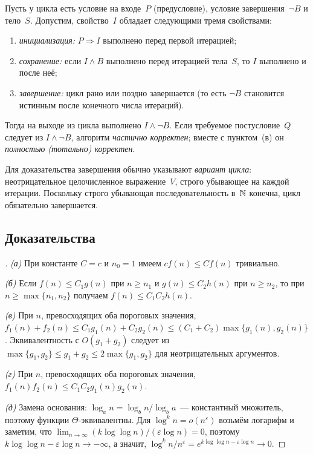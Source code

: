 \begin{theorem}
\label{thm:loop-invariant}
Пусть у цикла есть условие на входе~$P$ (предусловие), условие
завершения~$\neg B$ и тело~$S$. Допустим, свойство~$I$ обладает
следующими тремя свойствами:
\begin{enumerate}[label=(\alph*)]
  \item \emph{инициализация:} $P \Rightarrow I$ выполнено перед первой
        итерацией;
  \item \emph{сохранение:} если $I \wedge B$ выполнено перед итерацией
        тела~$S$, то $I$ выполнено и после неё;
  \item \emph{завершение:} цикл рано или поздно завершается (то есть
        $\neg B$ становится истинным после конечного числа итераций).
\end{enumerate}
Тогда на выходе из цикла выполнено $I \wedge \neg B$. Если требуемое
постусловие~$Q$ следует из $I \wedge \neg B$, алгоритм
\emph{частично корректен}; вместе с пунктом~(в) он
\emph{полностью (тотально) корректен}.
\end{theorem}

Для доказательства завершения обычно указывают \emph{вариант цикла}:
неотрицательное целочисленное выражение~$V$, строго убывающее на
каждой итерации. Поскольку строго убывающая последовательность в~$\mathbb{N}$
конечна, цикл обязательно завершается.

\subsection*{Доказательства}

\begin{proof}[]
\emph{(а)} При константе $C = c$ и $n_0 = 1$ имеем
$c f(n) \leq C f(n)$ тривиально.

\emph{(б)} Если $f(n) \leq C_1 g(n)$ при $n \geq n_1$ и
$g(n) \leq C_2 h(n)$ при $n \geq n_2$, то при
$n \geq \max\{n_1, n_2\}$ получаем $f(n) \leq C_1 C_2 h(n)$.

\emph{(в)} При $n$, превосходящих оба пороговых значения,
$f_1(n) + f_2(n) \leq C_1 g_1(n) + C_2 g_2(n) \leq (C_1 + C_2) \max\{g_1(n), g_2(n)\}$.
Эквивалентность с $O(g_1 + g_2)$ следует из
$\max\{g_1, g_2\} \leq g_1 + g_2 \leq 2 \max\{g_1, g_2\}$ для
неотрицательных аргументов.

\emph{(г)} При $n$, превосходящих оба пороговых значения,
$f_1(n) f_2(n) \leq C_1 C_2 g_1(n) g_2(n)$.

\emph{(д)} Замена основания: $\log_a n = \log_b n / \log_b a$~---
константный множитель, поэтому функции $\Theta$-эквивалентны. Для
$\log^k n = o(n^\varepsilon)$ возьмём логарифм и заметим, что
$\lim_{n \to \infty} (k \log \log n) / (\varepsilon \log n) = 0$,
поэтому $k \log \log n - \varepsilon \log n \to -\infty$, а значит,
$\log^k n / n^\varepsilon = e^{k \log\log n - \varepsilon \log n} \to 0$.
\end{proof}

